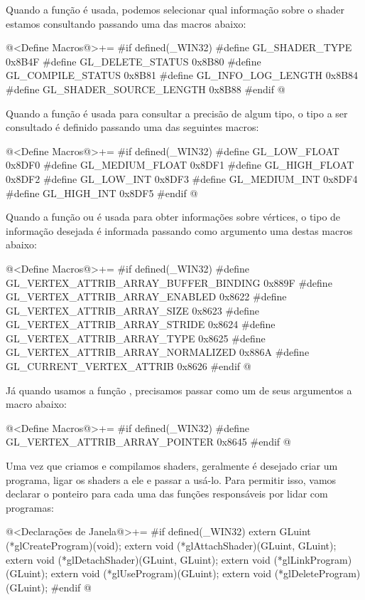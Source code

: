 Quando a função  é usada, podemos selecionar
qual informação sobre o shader estamos consultando passando uma das
macros abaixo:

\iniciocodigo
@<Define Macros@>+=
#if defined(_WIN32)
#define GL_SHADER_TYPE          0x8B4F
#define GL_DELETE_STATUS        0x8B80
#define GL_COMPILE_STATUS       0x8B81
#define GL_INFO_LOG_LENGTH      0x8B84
#define GL_SHADER_SOURCE_LENGTH 0x8B88
#endif
@
\fimcodigo

Quando a função  é usada para
consultar a precisão de algum tipo, o tipo a ser consultado é definido
passando uma das seguintes macros:

\iniciocodigo
@<Define Macros@>+=
#if defined(_WIN32)
#define GL_LOW_FLOAT    0x8DF0
#define GL_MEDIUM_FLOAT 0x8DF1
#define GL_HIGH_FLOAT   0x8DF2
#define GL_LOW_INT      0x8DF3
#define GL_MEDIUM_INT   0x8DF4
#define GL_HIGH_INT     0x8DF5
#endif
@
\fimcodigo

Quando a função 
ou  é usada para obter informações
sobre vértices, o tipo de informação desejada é informada passando
como argumento uma destas macros abaixo:

\iniciocodigo
@<Define Macros@>+=
#if defined(_WIN32)
#define GL_VERTEX_ATTRIB_ARRAY_BUFFER_BINDING 0x889F
#define GL_VERTEX_ATTRIB_ARRAY_ENABLED        0x8622
#define GL_VERTEX_ATTRIB_ARRAY_SIZE           0x8623
#define GL_VERTEX_ATTRIB_ARRAY_STRIDE         0x8624
#define GL_VERTEX_ATTRIB_ARRAY_TYPE           0x8625
#define GL_VERTEX_ATTRIB_ARRAY_NORMALIZED     0x886A
#define GL_CURRENT_VERTEX_ATTRIB              0x8626
#endif
@
\fimcodigo

Já quando usamos a função ,
precisamos passar como um de seus argumentos a macro abaixo:

\iniciocodigo
@<Define Macros@>+=
#if defined(_WIN32)
#define GL_VERTEX_ATTRIB_ARRAY_POINTER 0x8645
#endif
@
\fimcodigo

Uma vez que criamos e compilamos shaders, geralmente é desejado criar
um programa, ligar os shaders a ele e passar a usá-lo. Para permitir
isso, vamos declarar o ponteiro para cada uma das funções responsáveis
por lidar com programas:

\iniciocodigo
@<Declarações de Janela@>+=
#if defined(_WIN32)
extern GLuint (*glCreateProgram)(void);
extern void (*glAttachShader)(GLuint, GLuint);
extern void (*glDetachShader)(GLuint, GLuint);
extern void (*glLinkProgram)(GLuint);
extern void (*glUseProgram)(GLuint);
extern void (*glDeleteProgram)(GLuint);
#endif
@
\fimcodigo

